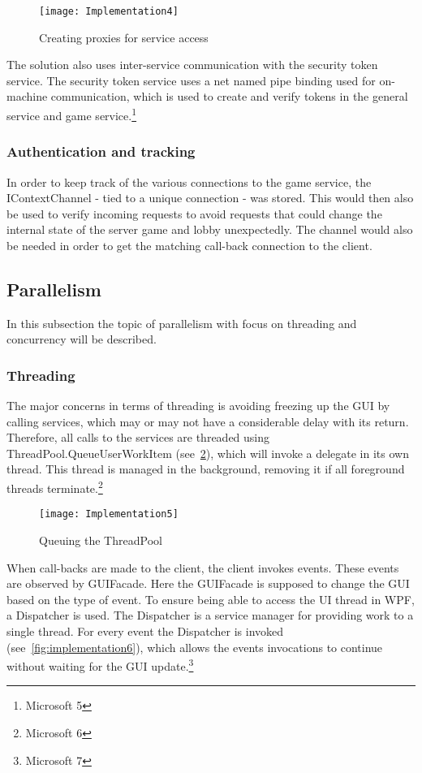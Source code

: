 \begin{figure}[h]
\centerline{\texttt{[image: Implementation4]}}
\caption {Creating proxies for service access}
\label {fig:implementation4}
\end{figure}

The solution also uses inter-service communication with the security
 token service. The security token service uses a net named pipe binding
  used for on-machine communication, which is used to create and verify
  tokens in the general service and game service.\footnote{Microsoft 5}
\newpage
\subsubsection {Authentication and tracking}
In order to keep track of the various connections to the game service,
 the IContextChannel - tied to a unique connection - was stored. This
 would then also be used to verify incoming requests to avoid requests
 that could change the internal state of the server game and lobby
  unexpectedly. The channel would also be needed in order to get the
   matching call-back connection to the client.

\subsection {Parallelism}
In this subsection the topic of parallelism with focus on threading and
concurrency will be described.

\subsubsection {Threading}
The major concerns in terms of threading is avoiding freezing up the GUI
by calling services, which may or may not have a considerable delay with
 its return. Therefore, all calls to the services are threaded using
 ThreadPool.QueueUserWorkItem (see~\ref{fig:implementation5}), which
 will invoke a delegate in its own thread. This thread is managed in
 the background, removing it if all foreground threads
  terminate.\footnote{Microsoft 6}

\begin{figure}[h]
\centerline{\texttt{[image: Implementation5]}}
\caption {Queuing the ThreadPool}
\label {fig:implementation5}
\end{figure}

When call-backs are made to the client, the client invokes events.
 These events are observed by GUIFacade. Here the GUIFacade is
  supposed to change the GUI based on the type of event. To ensure
   being able to access the UI thread in WPF, a Dispatcher is used.
    The Dispatcher is a service manager for providing work to a single
     thread. For every event the Dispatcher is invoked
     (see~\ref{fig:implementation6}), which allows the events invocations
      to continue without waiting for the GUI update.\footnote{Microsoft 7}

